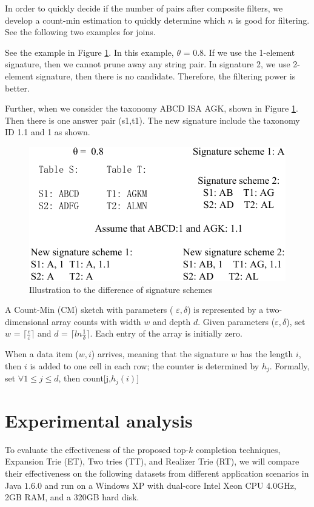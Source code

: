 \documentclass{sig-alternate}
\renewcommand{\leq}{\leqslant}
\begin{document}
In order to quickly decide if the number of pairs after composite filters, we develop a count-min estimation to quickly determine which $n$ is good for filtering. See the following two examples for joins. 

See the example in Figure \ref{fig:signature_example1}. In this example, $\theta$ = 0.8. If we use the 1-element signature, then we cannot prune away any string pair. In signature 2, we use 2-element signature, then there is no candidate. Therefore, the filtering power is better.

Further, when we consider the taxonomy ABCD ISA AGK, shown in Figure \ref{fig:signature_example1}. Then there is one answer pair (s1,t1). The new signature include the taxonomy ID 1.1 and 1  as shown.

\begin{figure}[h]
\centering
\includegraphics[scale=0.8]{figures/signature_example1}
 \caption{Illustration to the difference of signature schemes}
\label{fig:signature_example1}
\end{figure}

A Count-Min (CM) sketch with parameters ( $\varepsilon, \delta$) is represented by a two-dimensional
array counts with width $w$ and depth $d$. Given parameters ($\varepsilon, \delta$), set
$w$ = $\lceil \frac{e}{\varepsilon} \rceil$ and $d$ = $\lceil ln \frac{1}{\delta} \rceil $. Each entry of the array is initially zero.


When a data item ($w,i$) arrives, meaning that the signature $w$ has the length $i$, then $i$ is added to one cell in each row; the counter is determined by $h_j$. Formally, set $\forall 1 \leq j \leq d$, then count[j,$h_j(i)$]   

\section{Experimental analysis}

To evaluate the effectiveness of the proposed top-$k$ completion
techniques, Expansion Trie (ET), Two tries (TT), and  Realizer Trie (RT), we will compare
their effectiveness on the following datasets from different
application scenarios in Java $1.6.0$ and run on a
Windows XP with dual-core Intel Xeon CPU 4.0GHz, 2GB RAM, and a 320GB hard disk.
\end{document}
